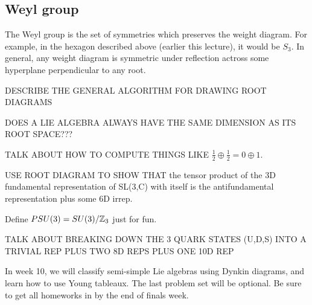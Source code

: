 \documentclass[class=article, crop=false]{standalone}
\begin{document}
\subsection{Weyl group}
The Weyl group is the set of symmetries which preserves the weight diagram. For example, in the hexagon described above (earlier this lecture), it would be $S_3$. In general, any weight diagram is symmetric under reflection actross some hyperplane perpendicular to any root.
\par
DESCRIBE THE GENERAL ALGORITHM FOR DRAWING ROOT DIAGRAMS
\par
DOES A LIE ALGEBRA ALWAYS HAVE THE SAME DIMENSION AS ITS ROOT SPACE???
\par
TALK ABOUT HOW TO COMPUTE THINGS LIKE $\frac{1}{2} \oplus \frac{1}{2} = 0 \oplus 1$.
\par
USE ROOT DIAGRAM TO SHOW THAT the tensor product of the 3D fundamental representation of SL(3,C) with itself is the antifundamental representation plus some 6D irrep.
\par
Define $PSU(3)=SU(3)/\mathbb{Z}_3$ just for fun.
\par
TALK ABOUT BREAKING DOWN THE 3 QUARK STATES (U,D,S) INTO A TRIVIAL REP PLUS TWO 8D REPS PLUS ONE 10D REP
\par
In week 10, we will classify semi-simple Lie algebras using Dynkin diagrams, and learn how to use Young tableaux. The last problem set will be optional. Be sure to get all homeworks in by the end of finals week.
\end{document}
